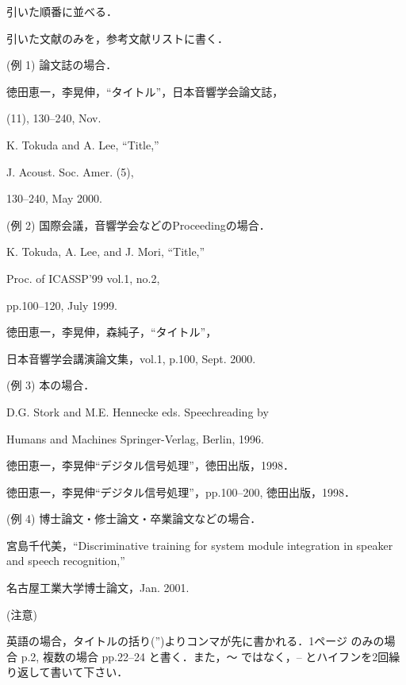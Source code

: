 引いた順番に並べる．

引いた文献のみを，参考文献リストに書く．

(例 1) 論文誌の場合．
        

徳田恵一，李晃伸，``タイトル''，日本音響学会論文誌，
      
(11), 130--240, Nov. 

K. Tokuda and A. Lee, ``Title,''
       
J. Acoust. Soc. Amer. (5), 
       
130--240, May 2000.

(例 2) 国際会議，音響学会などのProceedingの場合．


K. Tokuda, A. Lee, and J. Mori, ``Title,''
      
Proc. of ICASSP'99 vol.1, no.2,
      
pp.100--120, July 1999.

徳田恵一，李晃伸，森純子，``タイトル''，
      
日本音響学会講演論文集，vol.1, p.100, Sept. 2000.


(例 3) 本の場合．


D.G. Stork and M.E. Hennecke eds. Speechreading by
     
Humans and Machines Springer-Verlag, Berlin, 1996.

徳田恵一，李晃伸``デジタル信号処理''，徳田出版，1998．

徳田恵一，李晃伸``デジタル信号処理''，pp.100--200, 徳田出版，1998．


(例 4) 博士論文・修士論文・卒業論文などの場合．


宮島千代美，``Discriminative training for system module integration in speaker and speech recognition,'' 

名古屋工業大学博士論文，Jan. 2001.


(注意) 

英語の場合，タイトルの括り('')よりコンマが先に書かれる．1ページ
のみの場合 p.2, 複数の場合 pp.22--24 と書く．また，〜 ではなく，-- とハイフンを2回繰り返して書いて下さい．